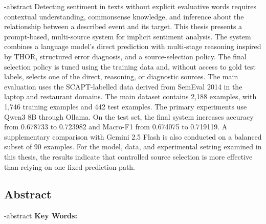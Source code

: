 
\en-abstract{
Detecting sentiment in texts without explicit evaluative words requires contextual understanding, commonsense knowledge, and inference about the relationship between a described event and its target. This thesis presents a prompt-based, multi-source system for implicit sentiment analysis. The system combines a language model's direct prediction with multi-stage reasoning inspired by THOR, structured error diagnosis, and a source-selection policy. The final selection policy is tuned using the training data and, without access to gold test labels, selects one of the direct, reasoning, or diagnostic sources. The main evaluation uses the SCAPT-labelled data derived from SemEval 2014 in the laptop and restaurant domains. The main dataset contains 2,188 examples, with 1,746 training examples and 442 test examples. The primary experiments use Qwen3 8B through Ollama. On the test set, the final system increases accuracy from 0.678733 to 0.723982 and Macro-F1 from 0.674075 to 0.719119. A supplementary comparison with Gemini 2.5 Flash is also conducted on a balanced subset of 90 examples. For the model, data, and experimental setting examined in this thesis, the results indicate that controlled source selection is more effective than relying on one fixed prediction path.
}

\newpage
\thispagestyle{empty}
\begin{latin}
\section*{\LARGE\centering Abstract}
\een-abstract
\vspace*{.5cm}
{\large\textbf{Key Words:}}\par
\vspace*{.5cm}
\elatinkeywords
\end{latin}
